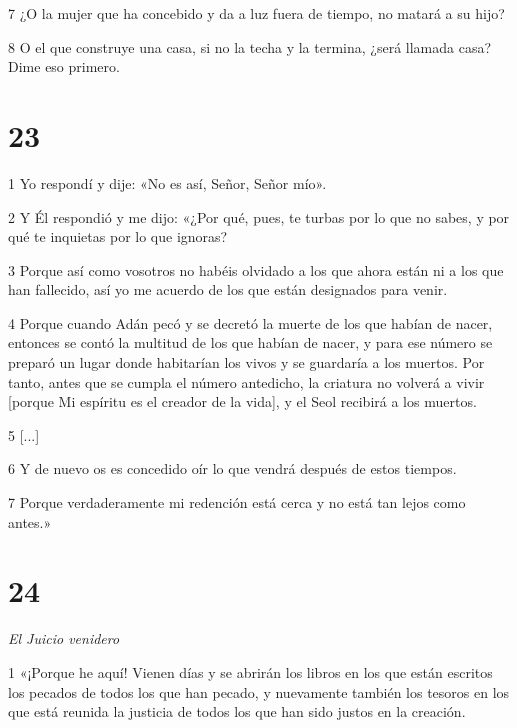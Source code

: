 \par 7 ¿O la mujer que ha concebido y da a luz fuera de tiempo, no matará a su hijo?

\par 8 O el que construye una casa, si no la techa y la termina, ¿será llamada casa? Dime eso primero.

\chapter{23}

\par 1 Yo respondí y dije: «No es así, Señor, Señor mío».

\par 2 Y Él respondió y me dijo: «¿Por qué, pues, te turbas por lo que no sabes, y por qué te inquietas por lo que ignoras?

\par 3 Porque así como vosotros no habéis olvidado a los que ahora están ni a los que han fallecido, así yo me acuerdo de los que están designados para venir.

\par 4 Porque cuando Adán pecó y se decretó la muerte de los que habían de nacer, entonces se contó la multitud de los que habían de nacer, y para ese número se preparó un lugar donde habitarían los vivos y se guardaría a los muertos. Por tanto, antes que se cumpla el número antedicho, la criatura no volverá a vivir [porque Mi espíritu es el creador de la vida], y el Seol recibirá a los muertos.

\par 5 [...]

\par 6 Y de nuevo os es concedido oír lo que vendrá después de estos tiempos.

\par 7 Porque verdaderamente mi redención está cerca y no está tan lejos como antes.»

\chapter{24}

\par \textit{El Juicio venidero}

\par 1 «¡Porque he aquí! Vienen días y se abrirán los libros en los que están escritos los pecados de todos los que han pecado, y nuevamente también los tesoros en los que está reunida la justicia de todos los que han sido justos en la creación.

